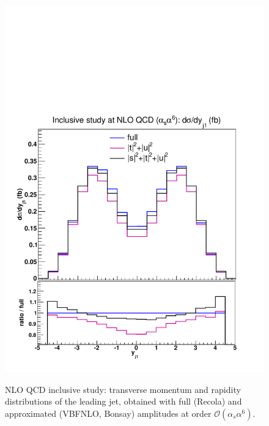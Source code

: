\begin{figure}[hbt]
{\includegraphics[scale=0.35]{figures/scanfigures/yj1_nlo.pdf}}
\caption{NLO QCD inclusive study: transverse momentum and rapidity distributions of the leading jet, obtained with full ({\sc Recola}) and approximated ({\sc VBFNLO, Bonsay}) amplitudes at order $\mathcal{O}(\alpha_s\alpha^6)$.} \label{fig:mjjdyjj_1d_2}
\end{figure}

